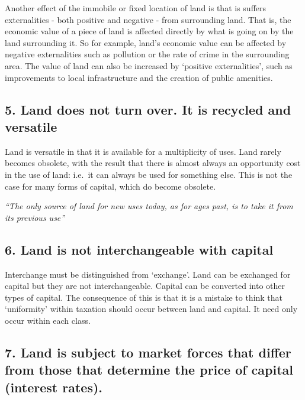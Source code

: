 \documentclass[]{tufte-handout}
\begin{document}
Another effect of the immobile or fixed location of land is that is
suffers externalities - both positive and negative - from surrounding
land. That is, the economic value of a piece of land is affected
directly by what is going on by the land surrounding it. So for example,
land's economic value can be affected by negative externalities such as
pollution or the rate of crime in the surrounding area. The value of
land can also be increased by `positive externalities', such as
improvements to local infrastructure and the creation of public
amenities.

\hypertarget{land-does-not-turn-over.-it-is-recycled-and-versatile}{%
\subsection{5. Land does not turn over. It is recycled and
versatile}\label{land-does-not-turn-over.-it-is-recycled-and-versatile}}

Land is versatile in that it is available for a multiplicity of uses.
Land rarely becomes obsolete, with the result that there is almost
always an opportunity cost in the use of land: i.e.~it can always be
used for something else. This is not the case for many forms of capital,
which do become obsolete.

\emph{``The only source of land for new uses today, as for ages past, is
to take it from its previous use''}

\hypertarget{land-is-not-interchangeable-with-capital}{%
\subsection{6. Land is not interchangeable with
capital}\label{land-is-not-interchangeable-with-capital}}

Interchange must be distinguished from `exchange'. Land can be exchanged
for capital but they are not interchangeable. Capital can be converted
into other types of capital. The consequence of this is that it is a
mistake to think that `uniformity' within taxation should occur between
land and capital. It need only occur within each class.

\hypertarget{land-is-subject-to-market-forces-that-differ-from-those-that-determine-the-price-of-capital-interest-rates.}{%
\subsection{7. Land is subject to market forces that differ from those
that determine the price of capital (interest
rates).}\label{land-is-subject-to-market-forces-that-differ-from-those-that-determine-the-price-of-capital-interest-rates.}}
\end{document}
